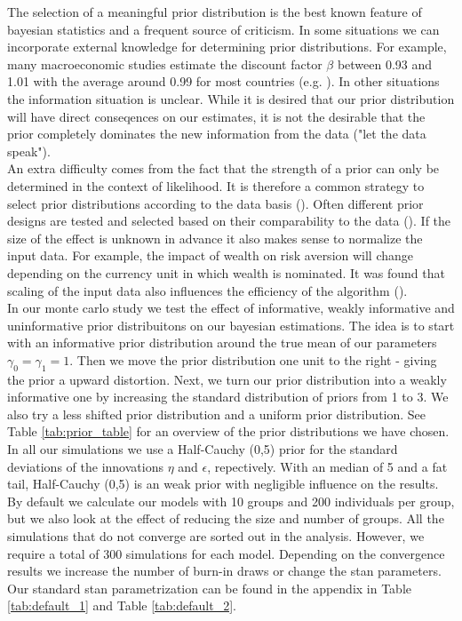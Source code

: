 The selection of a meaningful prior distribution is the best known feature of bayesian statistics and a frequent source of criticism. In some situations we can incorporate external knowledge for determining prior distributions. For example, many macroeconomic studies estimate the discount factor $\beta$ between 0.93 and 1.01 with the average around 0.99 for most countries (e.g. \cite{rumler2007}).
In other situations the information situation is unclear. While it is desired that our prior distribution will have direct conseqences on our estimates, it is not the desirable that the prior completely dominates the new information from the data ("let the data speak").\\
An extra difficulty comes from the fact that the strength of a prior can only be determined in the context of likelihood. It is therefore a common strategy to select prior distributions according to the data basis (\cite{gelman2017prior}). 
Often different prior designs are tested and selected based on their comparability to the data (\cite{leeper2017clearing}).
If the size of the effect is unknown in advance it also makes sense to normalize the input data. For example, the impact of wealth on risk aversion will change depending on the currency unit in which wealth is nominated. It was found that scaling of the input data also influences the efficiency of the algorithm (\cite{gelman2008weakly}). \\
In our monte carlo study we test the effect of informative, weakly informative and uninformative prior distribuitons on our bayesian estimations.
The idea is to start with an informative prior distribution around the true mean of our parameters $\gamma_0=\gamma_1=1$. Then we move the prior distribution one unit to the right - giving the prior a upward distortion.
Next, we turn our prior distribution into a weakly informative one by increasing the standard distribution of priors from 1 to 3.
We also try a less shifted prior distribution and a uniform prior distribution. See Table \ref{tab:prior_table} for an overview of the prior distributions we have chosen.\\
In all our simulations we use a Half-Cauchy (0,5) prior for the standard deviations of the innovations $\eta$ and $\epsilon$, repectively. With an median of 5 and a fat tail, Half-Cauchy (0,5)  is an weak prior with negligible influence on the results.
By default we calculate our models with 10 groups and 200 individuals per group, but we also look at the effect of reducing the size and number of groups. All the simulations that do not converge are sorted out in the analysis.
However, we require a total of 300 simulations for each model. Depending on the convergence results we increase the number of burn-in draws or change the stan parameters. Our standard stan parametrization can be found in the appendix  in Table \ref{tab:default_1} and Table \ref{tab:default_2}.



